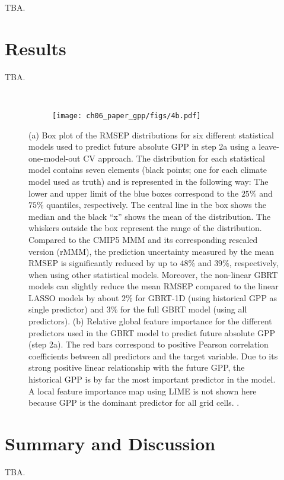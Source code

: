 TBA.


\section{Results}
\label{sec:06:results}

TBA.

\begin{figure}[t]
  \centering
  \begin{subfigure}[b]{\SubfigureWidth{}}
    \caption{}
    \label{fig:06:step2a_ml_inference:a}
  \end{subfigure}
  ~
  \begin{subfigure}[b]{\SubfigureWidth{}}
    \texttt{[image: ch06\_paper\_gpp/figs/4b.pdf]}
    \caption{}
    \label{fig:06:step2a_ml_inference:b}
  \end{subfigure}
  \caption{(a) Box plot of the \acf{RMSEP} distributions for six different
    statistical models used to predict future absolute \acf{GPP} in step 2a
    using a leave-one-model-out \acl{CV} approach. The distribution for each
    statistical model contains seven elements (black points; one for each
    climate model used as truth) and is represented in the following way: The
    lower and upper limit of the blue boxes correspond to the $25 \unit{\%}$
    and $75 \unit{\%}$ quantiles, respectively. The central line in the box
    shows the median and the black \enquote{x} shows the mean of the
    distribution. The whiskers outside the box represent the range of the
    distribution. Compared to the \acs{CMIP}5 \acf{MMM} and its corresponding
    rescaled version (r\acs{MMM}), the prediction uncertainty measured by the
    mean \acs{RMSEP} is significantly reduced by up to $48 \unit{\%}$ and $39
    \unit{\%}$, respectively, when using other statistical models. Moreover,
    the non-linear \acf{GBRT} models can slightly reduce the mean \acs{RMSEP}
    compared to the linear \acf{LASSO} models by about $2 \unit{\%}$ for
    \acs{GBRT}-1D (using historical \acs{GPP} as single predictor) and $3
    \unit{\%}$ for the full \acs{GBRT} model (using all predictors). (b)
    Relative global feature importance for the different predictors used in
    the \acs{GBRT} model to predict future absolute \acs{GPP} (step 2a). The
    red bars correspond to positive Pearson correlation coefficients between
    all predictors and the target variable. Due to its strong positive linear
    relationship with the future \acs{GPP}, the historical \acs{GPP} is by far
    the most important predictor in the model. A local feature importance map
    using \acf{LIME} is not shown here because \acs{GPP} is the dominant
    predictor for all grid cells. .}
  \label{fig:06:step2a_ml_inference}
\end{figure}


\section{Summary and Discussion}
\label{sec:06:summary_and_discussion}

TBA.
